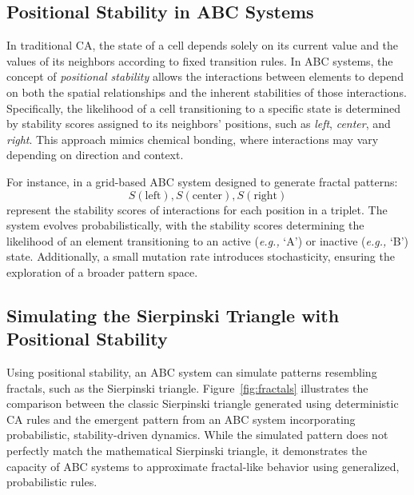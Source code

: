 \documentclass[entropy,article,submit,pdftex,moreauthors]{Definitions/mdpi}
\begin{document}
\subsection{Positional Stability in ABC Systems}

In traditional CA, the state of a cell depends solely on its current value and the values of its neighbors according to fixed transition rules. In ABC systems, the concept of \textit{positional stability} allows the interactions between elements to depend on both the spatial relationships and the inherent stabilities of those interactions. Specifically, the likelihood of a cell transitioning to a specific state is determined by stability scores assigned to its neighbors' positions, such as \textit{left}, \textit{center}, and \textit{right}. This approach mimics chemical bonding, where interactions may vary depending on direction and context.

For instance, in a grid-based ABC system designed to generate fractal patterns:
\[
S(\text{left}), S(\text{center}), S(\text{right})
\]
represent the stability scores of interactions for each position in a triplet. The system evolves probabilistically, with the stability scores determining the likelihood of an element transitioning to an active (\textit{e.g.,} `A') or inactive (\textit{e.g.,} `B') state. Additionally, a small mutation rate introduces stochasticity, ensuring the exploration of a broader pattern space.

\subsection{Simulating the Sierpinski Triangle with Positional Stability}

Using positional stability, an ABC system can simulate patterns resembling fractals, such as the Sierpinski triangle. Figure~\ref{fig:fractals} illustrates the comparison between the classic Sierpinski triangle generated using deterministic CA rules and the emergent pattern from an ABC system incorporating probabilistic, stability-driven dynamics. While the simulated pattern does not perfectly match the mathematical Sierpinski triangle, it demonstrates the capacity of ABC systems to approximate fractal-like behavior using generalized, probabilistic rules.
\end{document}
